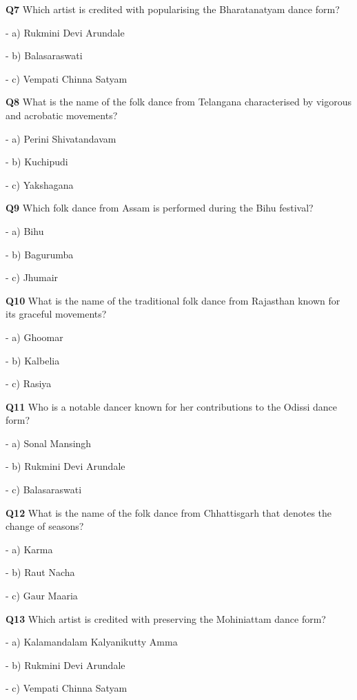 \textbf{Q7} Which artist is credited with popularising the Bharatanatyam dance form?\par
\quad - a) Rukmini Devi Arundale\par
\quad - b) Balasaraswati\par
\quad - c) Vempati Chinna Satyam\par

\textbf{Q8} What is the name of the folk dance from Telangana characterised by vigorous and acrobatic movements?\par
\quad - a) Perini Shivatandavam\par
\quad - b) Kuchipudi\par
\quad - c) Yakshagana\par

\textbf{Q9} Which folk dance from Assam is performed during the Bihu festival?\par
\quad - a) Bihu\par
\quad - b) Bagurumba\par
\quad - c) Jhumair\par

\textbf{Q10} What is the name of the traditional folk dance from Rajasthan known for its graceful movements?\par
\quad - a) Ghoomar\par
\quad - b) Kalbelia\par
\quad - c) Rasiya\par

\textbf{Q11} Who is a notable dancer known for her contributions to the Odissi dance form?\par
\quad - a) Sonal Mansingh\par
\quad - b) Rukmini Devi Arundale\par
\quad - c) Balasaraswati\par

\textbf{Q12} What is the name of the folk dance from Chhattisgarh that denotes the change of seasons?\par
\quad - a) Karma\par
\quad - b) Raut Nacha\par
\quad - c) Gaur Maaria\par

\textbf{Q13} Which artist is credited with preserving the Mohiniattam dance form?\par
\quad - a) Kalamandalam Kalyanikutty Amma\par
\quad - b) Rukmini Devi Arundale\par
\quad - c) Vempati Chinna Satyam\par

